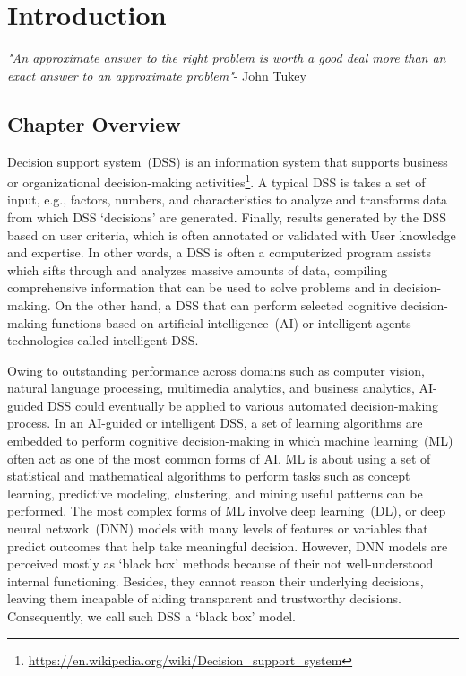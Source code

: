 \chapter{Introduction}
\label{chapter:introduction}
\textit{"An approximate answer to the right problem is worth a good deal more than an exact answer to an approximate problem"}- John Tukey

\section{Chapter Overview}
Decision support system~(DSS) is an information system that supports business or organizational decision-making activities\footnote{\url{https://en.wikipedia.org/wiki/Decision_support_system}}. A typical DSS is takes a set of input, e.g., factors, numbers, and characteristics to analyze and transforms data from which DSS `decisions' are generated. Finally, results generated by the DSS based on user criteria, which is often annotated or validated with User knowledge and expertise. In other words, a DSS is  often a computerized program assists which sifts through and analyzes massive amounts of data, compiling comprehensive information that can be used to solve problems and in decision-making. On the other hand, a DSS that can perform selected cognitive decision-making functions based on artificial intelligence~(AI) or intelligent agents technologies called intelligent DSS. 

\hspace*{3.5mm} Owing to outstanding performance across domains such as computer vision, natural language processing, multimedia analytics, and business analytics, AI-guided DSS could eventually be applied to various automated decision-making process. In an AI-guided or intelligent DSS, a set of learning algorithms are embedded to perform cognitive decision-making in which machine learning~(ML) often act as one of the most common forms of AI. ML is about using a set of statistical and mathematical algorithms to perform tasks such as concept learning, predictive modeling, clustering, and mining useful patterns can be performed. The most complex forms of ML involve deep learning~(DL), or deep neural network~(DNN) models with many levels of features or variables that predict outcomes that help take meaningful decision. However, DNN models are perceived mostly as `black box' methods because of their not well-understood internal functioning. Besides, they cannot reason their underlying decisions, leaving them incapable of aiding transparent and trustworthy decisions. Consequently, we call such DSS a `black box' model. 

